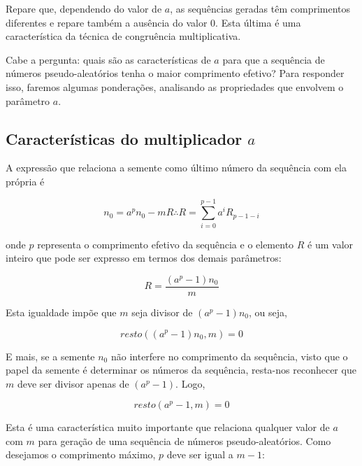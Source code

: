 \documentclass[a4paper,12pt,oneside,onecolumn]{uerj}
\begin{document}
Repare que, dependendo do valor de $a$, as sequências geradas têm comprimentos diferentes e repare também a ausência do valor $0$. Esta última é uma característica da técnica de congruência multiplicativa.

Cabe a pergunta: quais são as características de $a$ para que a sequência de números pseudo-aleatórios tenha o maior comprimento efetivo? Para responder isso, faremos algumas ponderações, analisando as propriedades que envolvem o parâmetro $a$.

\subsection{Características do multiplicador $a$}

A expressão que relaciona a semente como último número da sequência com ela própria é

\begin{equation}
n_0 = a^{p}n_0 - mR \therefore R = \sum_{i=0}^{p-1} a^iR_{p-1-i}
\end{equation}

\noindent onde $p$ representa o comprimento efetivo da sequência e o elemento $R$ é um valor inteiro que pode ser expresso em termos dos demais parâmetros:

\begin{equation}
R = \frac{(a^{p}-1)n_0}{m}
\end{equation}

\noindent Esta igualdade impõe que $m$ seja divisor de $(a^{p}-1)n_0$, ou seja,

\begin{equation}
resto((a^{p}-1)n_0,m)=0
\end{equation}

\noindent E mais, se a semente $n_0$ não interfere no comprimento da sequência, visto que o papel da semente é determinar os números da sequência, resta-nos reconhecer que $m$ deve ser divisor apenas de $(a^{p}-1)$. Logo,

\begin{equation}
resto(a^{p}-1,m)=0
\end{equation}

\noindent Esta é uma característica muito importante que relaciona qualquer valor de $a$ com $m$ para geração de uma sequência de números pseudo-aleatórios. Como desejamos o comprimento máximo, $p$ deve ser igual a $m-1$:
\end{document}
